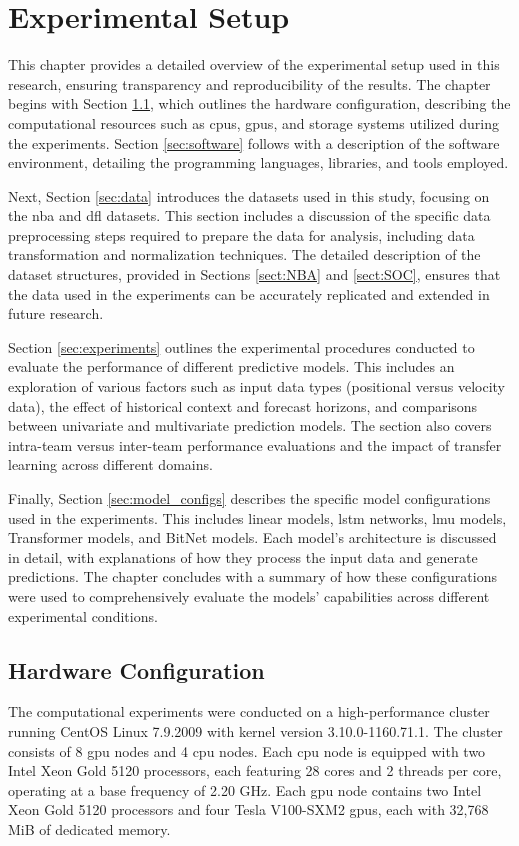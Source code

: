 \chapter{Experimental Setup}
This chapter provides a detailed overview of the experimental setup used in this research, ensuring transparency and reproducibility of the results. The chapter begins with Section \ref{sec:hardware}, which outlines the hardware configuration, describing the computational resources such as \glspl{cpu}, \glspl{gpu}, and storage systems utilized during the experiments. Section \ref{sec:software} follows with a description of the software environment, detailing the programming languages, libraries, and tools employed.

Next, Section \ref{sec:data} introduces the datasets used in this study, focusing on the \gls{nba} and \gls{dfl} datasets. This section includes a discussion of the specific data preprocessing steps required to prepare the data for analysis, including data transformation and normalization techniques. The detailed description of the dataset structures, provided in Sections \ref{sect:NBA} and \ref{sect:SOC}, ensures that the data used in the experiments can be accurately replicated and extended in future research.

Section \ref{sec:experiments} outlines the experimental procedures conducted to evaluate the performance of different predictive models. This includes an exploration of various factors such as input data types (positional versus velocity data), the effect of historical context and forecast horizons, and comparisons between univariate and multivariate prediction models. The section also covers intra-team versus inter-team performance evaluations and the impact of transfer learning across different domains.

Finally, Section \ref{sec:model_configs} describes the specific model configurations used in the experiments. This includes linear models, \gls{lstm} networks, \gls{lmu} models, Transformer models, and BitNet models. Each model's architecture is discussed in detail, with explanations of how they process the input data and generate predictions. The chapter concludes with a summary of how these configurations were used to comprehensively evaluate the models' capabilities across different experimental conditions.


\section{Hardware Configuration}
\label{sec:hardware}
The computational experiments were conducted on a high-performance cluster running CentOS Linux 7.9.2009 with kernel version 3.10.0-1160.71.1. The cluster consists of 8 \gls{gpu} nodes and 4 \gls{cpu} nodes. Each \gls{cpu} node is equipped with two Intel Xeon Gold 5120 processors, each featuring 28 cores and 2 threads per core, operating at a base frequency of 2.20 GHz. Each \gls{gpu} node contains two Intel Xeon Gold 5120 processors and four Tesla V100-SXM2 \glspl{gpu}, each with 32,768 MiB of dedicated memory.


